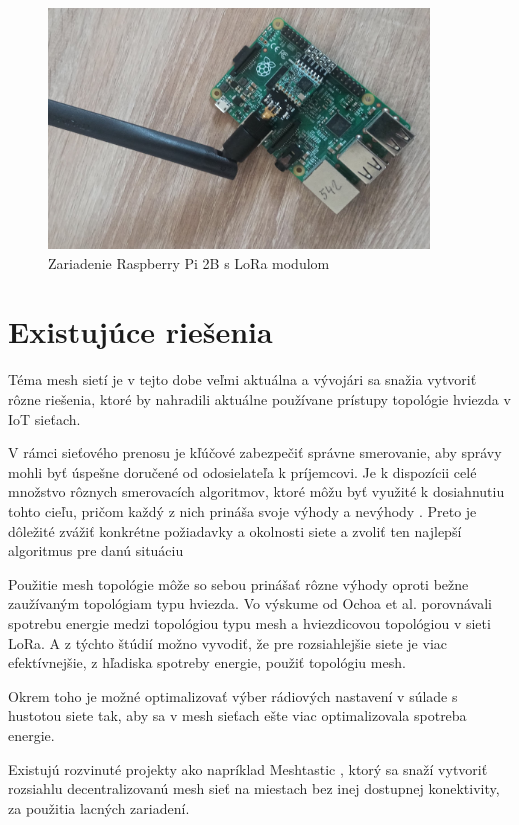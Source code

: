\documentclass[slovak,master]{diploma}
\begin{document}
\begin{figure}[h!]
	\centering
	\includegraphics[width=0.9\textwidth]{Figures/rpi2b.jpg}
	\caption{Zariadenie Raspberry Pi 2B s LoRa modulom}
	\label{fig:rpi2b}
\end{figure}


\chapter{Existujúce riešenia}
Téma mesh sietí je v tejto dobe veľmi aktuálna a vývojári sa snažia vytvoriť rôzne riešenia, ktoré by nahradili aktuálne používane 
prístupy topológie hviezda v IoT sieťach. 

V rámci sieťového prenosu je kľúčové zabezpečiť správne smerovanie, aby správy mohli byť úspešne doručené 
od odosielateľa k príjemcovi. Je k dispozícii celé množstvo rôznych smerovacích algoritmov, ktoré môžu byť využité 
k dosiahnutiu tohto cieľu, pričom každý z nich prináša svoje výhody a nevýhody \cite{ALOTAIBI2012940}. Preto je dôležité zvážiť 
konkrétne požiadavky a okolnosti siete a zvoliť ten najlepší algoritmus pre danú situáciu

Použitie mesh topológie môže so sebou prinášať rôzne výhody oproti bežne zaužívaným topológiam typu hviezda.
Vo výskume od Ochoa et al. \cite{8115793} porovnávali spotrebu energie medzi 
topológiou typu mesh a hviezdicovou topológiou v sieti LoRa. A z týchto štúdií možno vyvodiť, že pre rozsiahlejšie siete je viac
efektívnejšie, z hľadiska spotreby energie, použiť topológiu mesh. 

Okrem toho je možné optimalizovať výber rádiových nastavení v súlade s hustotou siete tak, 
aby sa v mesh sieťach ešte viac optimalizovala spotreba energie.


Existujú rozvinuté projekty ako napríklad Meshtastic \cite{meshtastic}, ktorý sa snaží vytvoriť rozsiahlu decentralizovanú mesh sieť na miestach bez inej dostupnej konektivity, 
za použitia lacných zariadení.
\end{document}
